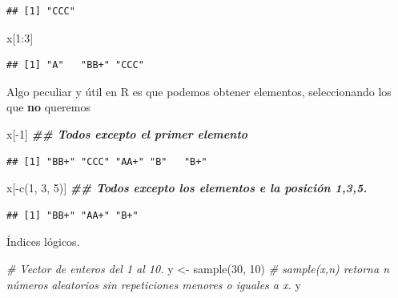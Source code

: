 \documentclass[
  12pt,
]{book}
\newenvironment{Shaded}{\begin{snugshade}}{\end{snugshade}}
\newcommand{\CommentTok}[1]{\textcolor[rgb]{0.56,0.35,0.01}{\textit{#1}}}
\newcommand{\DecValTok}[1]{\textcolor[rgb]{0.00,0.00,0.81}{#1}}
\newcommand{\DocumentationTok}[1]{\textcolor[rgb]{0.56,0.35,0.01}{\textbf{\textit{#1}}}}
\newcommand{\FunctionTok}[1]{\textcolor[rgb]{0.00,0.00,0.00}{#1}}
\newcommand{\NormalTok}[1]{#1}
\newcommand{\OtherTok}[1]{\textcolor[rgb]{0.56,0.35,0.01}{#1}}
\newcommand{\SpecialCharTok}[1]{\textcolor[rgb]{0.00,0.00,0.00}{#1}}
\begin{document}
\begin{verbatim}
## [1] "CCC"
\end{verbatim}

\begin{Shaded}
\begin{Highlighting}[]
\NormalTok{x[}\DecValTok{1}\SpecialCharTok{:}\DecValTok{3}\NormalTok{]}
\end{Highlighting}
\end{Shaded}

\begin{verbatim}
## [1] "A"   "BB+" "CCC"
\end{verbatim}

Algo peculiar y útil en R es que podemos obtener elementos, seleccionando los que \textbf{no} queremos

\begin{Shaded}
\begin{Highlighting}[]
\NormalTok{x[}\SpecialCharTok{{-}}\DecValTok{1}\NormalTok{]  }\DocumentationTok{\#\# Todos excepto el primer elemento}
\end{Highlighting}
\end{Shaded}

\begin{verbatim}
## [1] "BB+" "CCC" "AA+" "B"   "B+"
\end{verbatim}

\begin{Shaded}
\begin{Highlighting}[]
\NormalTok{x[}\SpecialCharTok{{-}}\FunctionTok{c}\NormalTok{(}\DecValTok{1}\NormalTok{, }\DecValTok{3}\NormalTok{, }\DecValTok{5}\NormalTok{)] }\DocumentationTok{\#\# Todos excepto los elementos e la posición 1,3,5.}
\end{Highlighting}
\end{Shaded}

\begin{verbatim}
## [1] "BB+" "AA+" "B+"
\end{verbatim}

Índices lógicos.

\begin{Shaded}
\begin{Highlighting}[]
\CommentTok{\# Vector de enteros del 1 al 10.}
\NormalTok{y }\OtherTok{\textless{}{-}} \FunctionTok{sample}\NormalTok{(}\DecValTok{30}\NormalTok{, }\DecValTok{10}\NormalTok{)}
\CommentTok{\# sample(x,n) retorna n números aleatorios sin repeticiones menores o iguales a x.}
\NormalTok{y}
\end{Highlighting}
\end{Shaded}
\end{document}
